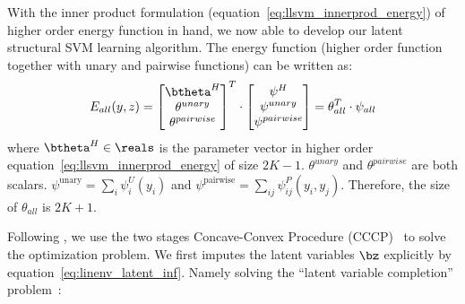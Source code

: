 \documentclass[sigconf]{acmart}
\renewcommand{\citename}{\citet}
\renewcommand{\cite}{\citep}
\begin{document}
With the inner product formulation
(equation~\eqref{eq:llsvm_innerprod_energy}) of higher order
energy function in hand, we now able to develop our latent
structural SVM learning algorithm. The energy function (higher
order function together with unary and pairwise functions) can be
written as:
\begin{equation}
  E_{all}(y,z) = \begin{bmatrix}
    \btheta^H\\
    \theta^{unary}\\
    \theta^{pairwise}
  \end{bmatrix}^T 
  \cdot \begin{bmatrix}
    \psi^H\\
    \psi^{unary}\\
    \psi^{pairwise}
  \end{bmatrix}=\theta_{all}^T\cdot\psi_{all}
\end{equation}
where $\btheta^H\in \reals$ is the parameter vector in higher
order equation~\eqref{eq:llsvm_innerprod_energy} of size $2K-1$.
$\theta^{unary}$ and $\theta^{pairwise}$ are both scalars.
$\psi^\textrm{unary} = \sum_i \psi^U_i\!(y_i)$ and
$\psi^\textrm{pairwise} = \sum_{ij} \psi^P_{ij}(y_i, y_j)$.
Therefore, the size of $\theta_{all}$ is $2K+1$.



Following \citename{yu2009learning}, we use the two stages Concave-Convex
Procedure (CCCP)~\cite{yuille2002concave} to solve the
optimization problem. We first
imputes the latent variables $\bz$ explicitly by
equation~\eqref{eq:linenv_latent_inf}. Namely solving the
``latent variable completion'' problem~\cite{yu2009learning}:
\end{document}
